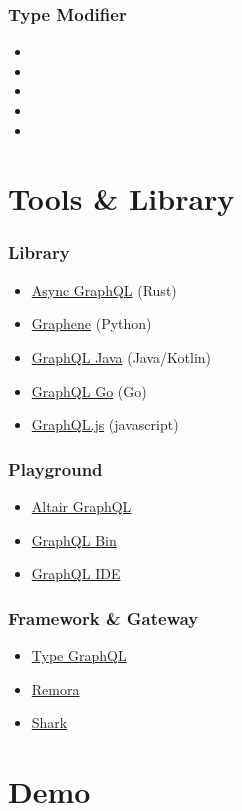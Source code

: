 \documentclass[12pt,xcolor=table]{beamer}
\begin{document}
\begin{frame}
\frametitle{Type Modifier}
\begin{itemize}\small
    \item {}
    \item {}
    \item {}
    \item {}
    \item {}
\end{itemize}
\end{frame}

\section{Tools & Library}

\begin{frame}
\frametitle{Library}
\begin{itemize}\small
    \item \href{https://github.com/async-graphql/async-graphql}{Async GraphQL} (Rust)
    \item \href{http://graphene-python.org/}{Graphene} (Python)
    \item \href{https://github.com/graphql-java/graphql-java}{GraphQL Java} (Java/Kotlin)
    \item \href{https://github.com/graphql-go/graphql}{GraphQL Go} (Go)
    \item \href{https://graphql.org/graphql-js/}{GraphQL.js} (javascript)
\end{itemize}
\end{frame}

\begin{frame}
\frametitle{Playground}
\begin{itemize}\small
    \item \href{https://altairgraphql.dev/}{Altair GraphQL}
    \item \href{https://www.graphqlbin.com/v2/new}{GraphQL Bin}
    \item \href{https://github.com/graphql/graphql-playground}{GraphQL IDE}
\end{itemize}
\end{frame}

\begin{frame}
\frametitle{Framework \& Gateway}
\begin{itemize}\small
    \item \href{https://typegraphql.com/}{Type GraphQL}
    \item \href{https://github.com/graphteon/remora}{Remora}
    \item \href{https://github.com/graphteon/shark}{Shark}
\end{itemize}
\end{frame}

\section{Demo}
\end{document}
